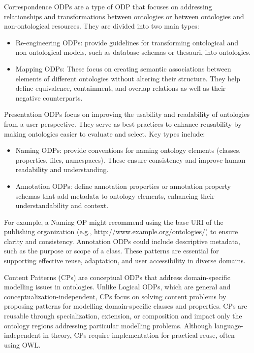 Correspondence ODPs are a type of ODP that focuses on addressing relationships and transformations between ontologies or between ontologies and non-ontological resources.
They are divided into two main types:
\begin{itemize}
    \item Re-engineering ODPs: provide guidelines for transforming ontological and non-ontological models, such as database schemas or thesauri, into ontologies. 

    \item Mapping ODPs: These focus on creating semantic associations between elements of different ontologies without altering their structure. They help define equivalence, containment, and overlap relations as well as their negative counterparts.
\end{itemize}

Presentation ODPs focus on improving the usability and readability of ontologies from a user perspective.
They serve as best practices to enhance reusability by making ontologies easier to evaluate and select.
Key types include:
\begin{itemize}
    \item Naming ODPs: provide conventions for naming ontology elements (classes, properties, files, namespaces). These ensure consistency and improve human readability and understanding.

    \item Annotation ODPs: define annotation properties or annotation property schemas that add metadata to ontology elements, enhancing their understandability and context.
\end{itemize}
For example, a Naming OP might recommend using the base URI of the publishing organization (e.g., http://www.example.org/ontologies/) to ensure clarity and consistency.
Annotation ODPs could include descriptive metadata, such as the purpose or scope of a class.
These patterns are essential for supporting effective reuse, adaptation, and user accessibility in diverse domains.

Content Patterns (CPs) are conceptual ODPs that address domain-specific modelling issues in ontologies.
Unlike Logical ODPs, which are general and conceptualization-independent, CPs focus on solving content problems by proposing patterns for modelling domain-specific classes and properties.
CPs are reusable through specialization, extension, or composition and impact only the ontology regions addressing particular modelling problems.
Although language-independent in theory, CPs require implementation for practical reuse, often using OWL.

